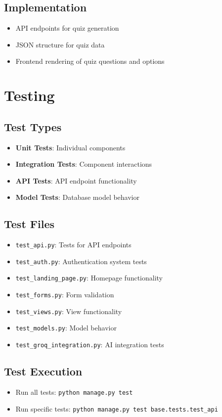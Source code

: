 \documentclass[11pt]{article}
\begin{document}
\subsection{Implementation}
\begin{itemize}
  \item API endpoints for quiz generation
  \item JSON structure for quiz data
  \item Frontend rendering of quiz questions and options
\end{itemize}

\section{Testing}

\subsection{Test Types}
\begin{itemize}
  \item \textbf{Unit Tests}: Individual components
  \item \textbf{Integration Tests}: Component interactions
  \item \textbf{API Tests}: API endpoint functionality
  \item \textbf{Model Tests}: Database model behavior
\end{itemize}

\subsection{Test Files}
\begin{itemize}
  \item \texttt{test\_api.py}: Tests for API endpoints
  \item \texttt{test\_auth.py}: Authentication system tests
  \item \texttt{test\_landing\_page.py}: Homepage functionality
  \item \texttt{test\_forms.py}: Form validation
  \item \texttt{test\_views.py}: View functionality
  \item \texttt{test\_models.py}: Model behavior
  \item \texttt{test\_groq\_integration.py}: AI integration tests
\end{itemize}

\subsection{Test Execution}
\begin{itemize}
  \item Run all tests: \texttt{python manage.py test}
  \item Run specific tests: \texttt{python manage.py test base.tests.test\_api}
\end{itemize}
\end{document}
